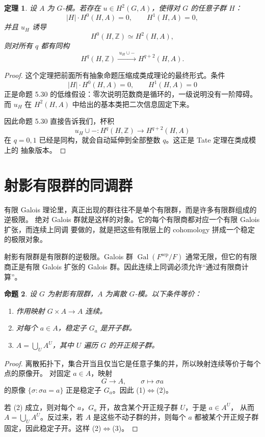 \documentclass[11pt,a4paper,openany]{ctexbook}
\numberwithin{equation}{chapter}
\newcommand{\Z}{\mathbb{Z}}
\theoremstyle{plain}
\newtheorem{theorem}{定理}[chapter]
\newtheorem{proposition}[theorem]{命题}
\theoremstyle{definition}
\theoremstyle{remark}
\begin{document}
\begin{theorem}
设 $A$ 为 $G$-模。若存在 $u\in H^2(G,A)$，使得对 $G$ 的任意子群 $H$：
\[
 |H|\cdot H^0(H,A)=0,\qquad
 H^1(H,A)=0,
\]
并且 $u_H$ 诱导
\[
 H^0(H,\Z)\simeq H^2(H,A),
\]
则对所有 $q$ 都有同构
\[
 H^q(H,\Z)\xrightarrow{\;u_H\cup-\;}H^{q+2}(H,A).
\]
\end{theorem}

\begin{proof}
这个定理把前面所有抽象命题压缩成类成理论的最终形式。条件
\[
|H|\cdot H^0(H,A)=0,\qquad H^1(H,A)=0
\]
正是命题 5.30 的低维假设：零次说明范数商是循环的，一级说明没有一阶障碍。
而 $u_H$ 在 $H^2(H,A)$ 中给出的基本类把二次信息固定下来。

因此命题 5.30 直接告诉我们，杯积
\[
u_H\cup-:H^q(H,\Z)\to H^{q+2}(H,A)
\]
在 $q=0,1$ 已经是同构，就会自动延伸到全部整数 $q$。这正是 Tate 定理在类成模上的
抽象版本。
\end{proof}

\section{射影有限群的同调群}

有限 Galois 理论里，真正出现的群往往不是单个有限群，而是许多有限群组成的逆极限。
绝对 Galois 群就是这样的对象。它的每个有限商都对应一个有限 Galois 扩张，而连续上同调
要做的，就是把这些有限层上的 cohomology 拼成一个稳定的极限对象。

射影有限群是有限群的逆极限。Galois 群 $\operatorname{Gal}(F^{\operatorname{sep}}/F)$ 通常无限，但它的有限商正是有限 Galois 扩张的 Galois 群。因此连续上同调必须允许“通过有限商计算”。

\begin{proposition}
设 $G$ 为射影有限群，$A$ 为离散 $G$-模。以下条件等价：
\begin{enumerate}[label=(\arabic*)]
\item 作用映射 $G\times A\to A$ 连续。
\item 对每个 $a\in A$，稳定子 $G_a$ 是开子群。
\item $A=\bigcup_U A^U$，其中 $U$ 遍历 $G$ 的开正规子群。
\end{enumerate}
\end{proposition}

\begin{proof}
离散拓扑下，集合开当且仅当它是任意子集的并，所以映射连续等价于每个点的原像开。
对固定 $a\in A$，映射
\[
G\to A,\qquad \sigma\mapsto \sigma a
\]
的原像 $\{ \sigma:\sigma a=a\}$ 正是稳定子 $G_a$。因此 (1)$\Leftrightarrow$(2)。

若 (2) 成立，则对每个 $a$，$G_a$ 开，故含某个开正规子群 $U$，于是 $a\in A^U$，
从而 $A=\bigcup_U A^U$。反过来，若 $A$ 是这些不动子群的并，则每个 $a$ 都被某个开正规子群
固定，因此稳定子开。这样 (2)$\Leftrightarrow$(3)。
\end{proof}
\end{document}
